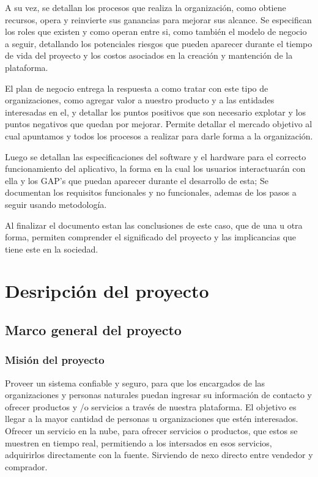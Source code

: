 \documentclass[letterpaper,openright,10pt,oneside]{report}
\begin{document}
	A su vez, se detallan los procesos que realiza la organización, como obtiene recursos, opera y reinvierte sus ganancias para mejorar sus alcance. Se especifican los roles que existen y como operan entre si, como también el modelo de negocio a seguir, detallando los potenciales riesgos que pueden aparecer durante el tiempo de vida del proyecto y los costos asociados en la creación y mantención de la plataforma.
	
	El plan de negocio entrega la respuesta a como tratar con este tipo de organizaciones, como agregar valor a nuestro producto y a las entidades interesadas en el, y detallar los puntos positivos que son necesario explotar y los puntos negativos que quedan por mejorar. Permite detallar el mercado objetivo al cual apuntamos y todos los procesos a realizar para darle forma a la organización.
	
	Luego se detallan las especificaciones del software y el hardware para el correcto funcionamiento del aplicativo, la forma en la cual los usuarios interactuarán con ella y los GAP's que puedan aparecer durante el desarrollo de esta; Se documentan los requisitos funcionales y no funcionales, ademas de los pasos a seguir usando metodología.
	
	Al finalizar el documento estan las conclusiones de este caso, que de una u otra forma, permiten comprender el significado del proyecto y las implicancias que tiene este en la sociedad.
\tableofcontents
\newpage
\part{Desripción del proyecto}
	\chapter{Marco general del proyecto}
		\section{Misión del proyecto}
		
		Proveer un sistema confiable y seguro, para que los encargados de las organizaciones y personas naturales puedan ingresar su información de contacto y ofrecer productos y /o servicios a través de nuestra plataforma. El objetivo es llegar a la mayor cantidad de personas u organizaciones que estén interesados.
		Ofrecer un servicio en la nube, para ofrecer servicios o productos, que estos se muestren en tiempo real, permitiendo a los intersados en esos servicios, adquirirlos directamente con la fuente. Sirviendo de nexo directo entre vendedor y comprador.
\end{document}
